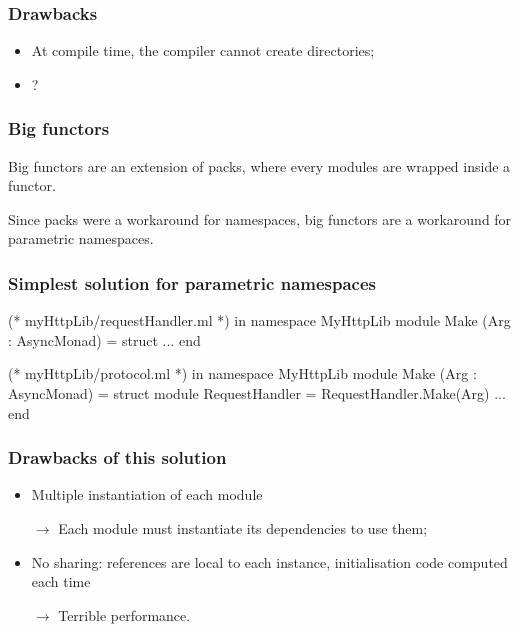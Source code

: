 \documentclass{beamer}
\begin{document}
\begin{frame}
\frametitle{Drawbacks}
\begin{itemize}[<+>]
\item At compile time, the compiler cannot create directories;
\item ?
\end{itemize}
\end{frame}

\begin{frame}
\frametitle{Big functors}

Big functors are an extension of packs, where every modules are wrapped inside a
functor. 

\medskip

Since packs were a workaround for namespaces, big functors are a workaround for
parametric namespaces.

\end{frame}

\begin{frame}[fragile]
  \frametitle{Simplest solution for parametric namespaces}
    \begin{OCaml}
      (* myHttpLib/requestHandler.ml *)
      in namespace MyHttpLib
      module Make (Arg : AsyncMonad) = 
        struct 
          ...
        end
    \end{OCaml}

    \pause 

    \begin{OCaml}
      (* myHttpLib/protocol.ml *)
      in namespace MyHttpLib
      module Make (Arg : AsyncMonad) = 
        struct
          module RequestHandler = RequestHandler.Make(Arg)
          ...
        end
    \end{OCaml}
\end{frame}

\begin{frame}
  \frametitle{Drawbacks of this solution}
  \begin{itemize}[<+->]
    \item Multiple instantiation of each module

      $\rightarrow$ Each module must instantiate its dependencies to use them;
    \item No sharing: references are local to each instance, initialisation code
      computed each time
    
      $\rightarrow$ Terrible performance.
  \end{itemize}
\end{frame}
\end{document}

